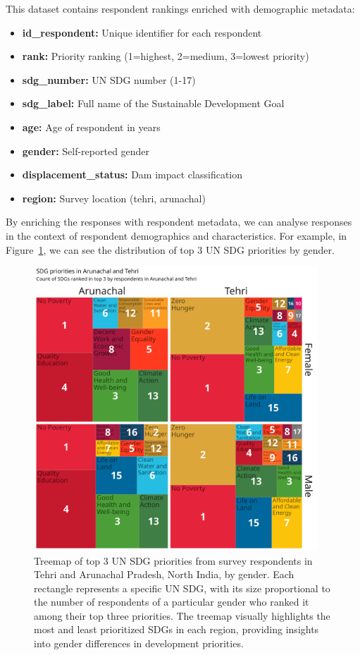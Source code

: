 \documentclass{article}
\begin{document}
This dataset contains respondent rankings enriched with demographic metadata:
\begin{itemize}
  \item \textbf{id\_respondent:} Unique identifier for each respondent
  \item \textbf{rank:} Priority ranking (1=highest, 2=medium, 3=lowest priority)
  \item \textbf{sdg\_number:} UN SDG number (1-17)
  \item \textbf{sdg\_label:} Full name of the Sustainable Development Goal
  \item \textbf{age:} Age of respondent in years
  \item \textbf{gender:} Self-reported gender
  \item \textbf{displacement\_status:} Dam impact classification
  \item \textbf{region:} Survey location (tehri, arunachal)
\end{itemize}

By enriching the responses with respondent metadata, we can analyse responses in the context of respondent demographics and characteristics. For example, in Figure~\ref{fig:top3-gender-treemap}, we can see the distribution of top 3 UN SDG priorities by gender.

\begin{figure}[ht]
  \centering
  \includegraphics[width=0.95\textwidth]{../figures_and_tables/top3-gender-treemap.png}
  \caption{\label{fig:top3-gender-treemap} Treemap of top 3 UN SDG priorities from survey respondents in Tehri and Arunachal Pradesh, North India, by gender. Each rectangle represents a specific UN SDG, with its size proportional to the number of respondents of a particular gender who ranked it among their top three priorities. The treemap visually highlights the most and least prioritized SDGs in each region, providing insights into gender differences in development priorities.}
\end{figure}
\end{document}
